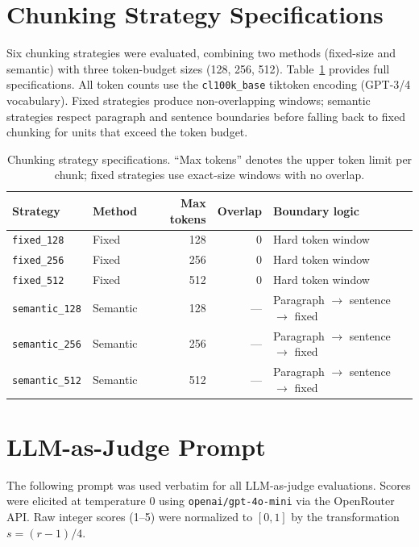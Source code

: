 

\section{Chunking Strategy Specifications}
\label{app:chunking}

Six chunking strategies were evaluated, combining two methods (fixed-size and
semantic) with three token-budget sizes (128, 256, 512). Table~\ref{tab:chunking}
provides full specifications. All token counts use the \texttt{cl100k\_base}
tiktoken encoding (GPT-3/4 vocabulary). Fixed strategies produce non-overlapping
windows; semantic strategies respect paragraph and sentence boundaries before
falling back to fixed chunking for units that exceed the token budget.

\begin{table}[h]
\centering
\caption{Chunking strategy specifications. ``Max tokens'' denotes the upper token
limit per chunk; fixed strategies use exact-size windows with no overlap.}
\label{tab:chunking}
\begin{tabular}{llrrl}
\toprule
\textbf{Strategy} & \textbf{Method} & \textbf{Max tokens} & \textbf{Overlap} & \textbf{Boundary logic} \\
\midrule
\texttt{fixed\_128}    & Fixed    & 128 & 0   & Hard token window \\
\texttt{fixed\_256}    & Fixed    & 256 & 0   & Hard token window \\
\texttt{fixed\_512}    & Fixed    & 512 & 0   & Hard token window \\
\texttt{semantic\_128} & Semantic & 128 & --- & Paragraph $\to$ sentence $\to$ fixed \\
\texttt{semantic\_256} & Semantic & 256 & --- & Paragraph $\to$ sentence $\to$ fixed \\
\texttt{semantic\_512} & Semantic & 512 & --- & Paragraph $\to$ sentence $\to$ fixed \\
\bottomrule
\end{tabular}
\end{table}

\section{LLM-as-Judge Prompt}
\label{app:judge_prompt}

The following prompt was used verbatim for all LLM-as-judge evaluations.
Scores were elicited at temperature 0 using \texttt{openai/gpt-4o-mini} via
the OpenRouter API. Raw integer scores (1--5) were normalized to $[0, 1]$ by
the transformation $s = (r - 1) / 4$.

